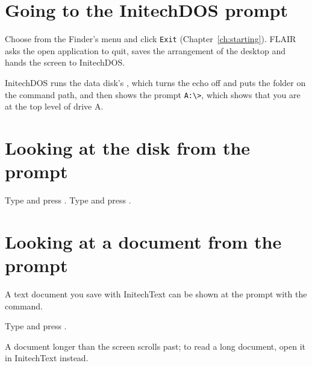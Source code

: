 \section{Going to the InitechDOS prompt}
Choose  from the Finder's 
menu and click \texttt{Exit} (Chapter~\ref{ch:starting}).  FLAIR asks the open application
to quit, saves the arrangement of the desktop and hands the screen to
InitechDOS.

InitechDOS runs the data disk's , which turns the echo
off and puts the  folder on the command path, and then shows the
prompt \texttt{A:\textbackslash>}, which shows that you are at the top level
of drive A.

\section{Looking at the disk from the prompt}
\begin{TaskSteps}
\Step Type  and press .
\Step Type  and press .
\end{TaskSteps}


\section{Looking at a document from the prompt}
A text document you save with InitechText can be shown at the prompt with
the  command.
\begin{TaskSteps}
\Step Type  and press .
\end{TaskSteps}


A document longer than the screen scrolls past; to read a long document,
open it in InitechText instead.

